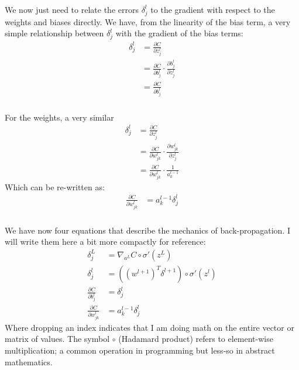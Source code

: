 \documentclass[xetex,mathserif,serif,aspectratio=169]{beamer}
\begin{document}
\begin{frame}[fragile] \frametitle{} \oldB \small


We now just need to relate the errors $\delta_j^l$ to the
gradient with respect to the weights and biases directly.
We have, from the linearity of the bias term, a very simple
relationship between $\delta_j^l$ with the gradient of
the bias terms:
\begin{align*}
\delta_j^l &= \frac{\partial C}{ \partial z_j^l} \\
&=\frac{\partial C}{ \partial b_j^l} \cdot \frac{\partial b_j^l}{ \partial z_j^l} \\
&=\frac{\partial C}{ \partial b_j^l}
\end{align*}


\end{frame}


\begin{frame}[fragile] \frametitle{} \oldB \small


For the weights, a very similar
\begin{align*}
\delta_j^l &= \frac{\partial C}{ \partial z_j^l} \\
&=\frac{\partial C}{ \partial w_{jk}^l} \cdot \frac{\partial w_{jk}^l}{ \partial z_j^l} \\
&=\frac{\partial C}{ \partial  w_{jk}^l} \cdot \frac{1}{a^{l-1}_k}
\end{align*}
Which can be re-written as:
\begin{align*}
\frac{\partial C}{ \partial w_{jk}^l} &= a^{l-1}_k \delta_j^l
\end{align*}

\end{frame}


\begin{frame}[fragile] \frametitle{} \oldB \small


We have now four equations that describe the mechanics of back-propagation.
I will write them here a bit more compactly for reference:
\begin{align*}
\delta_j^L &= \nabla_{a^L} C \circ \sigma'(z^L) \\
\delta_j^l &= ((w^{l+1})^T \delta^{l+1}) \circ \sigma'(z^l) \\
\frac{\partial C}{\partial b^l_j} &= \delta^l_j \\
\frac{\partial C}{\partial w^l_{jk}} &= a^{l-1}_k \delta^l_j
\end{align*}
Where dropping an index indicates that I am doing math on the entire vector
or matrix of values. The symbol $\circ$ (Hadamard product)
refers to element-wise multiplication; a common operation in programming
but less-so in abstract mathematics.

\end{frame}
\end{document}
